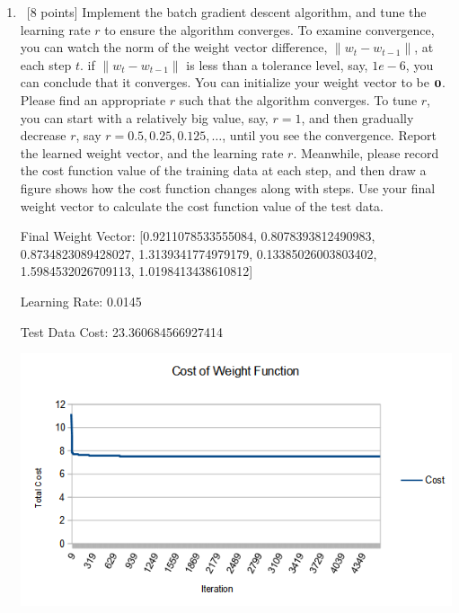 \documentclass[12pt, fullpage,letterpaper]{article}
\begin{document}
\begin{enumerate}
	\begin{enumerate}
		\item~[8 points] Implement the batch gradient descent algorithm, and tune the learning rate $r$ to ensure the algorithm converges.  To examine convergence, you can watch the norm of the weight vector difference,  $\|w_{t} - w_{t-1}\|$,  at each step $t$.  if $\|w_{t} - w_{t-1}\|$ is  less than a tolerance level, say, $1e-6$, you can conclude that it converges. You can initialize your weight vector to be ${\bf 0}$.  Please find an appropriate $r$ such that the algorithm converges. To tune $r$, you can start with a relatively big value, say, $r=1$, and then gradually decrease $r$, say $r=0.5, 0.25, 0.125, \ldots$, until you see the convergence. 
		Report the learned weight vector, and the learning rate $r$. Meanwhile, please record the cost function  value of the training data at each step, and then draw a figure shows how the cost function changes along with steps. Use your final weight vector to calculate  the cost function value of the test data. 
		
		\bigskip
		
		Final Weight Vector: [0.9211078533555084, 0.8078393812490983, 0.8734823089428027, 1.3139341774979179, 0.13385026003803402, 1.5984532026709113, 1.0198413438610812]
		
		Learning Rate: 0.0145
		
		Test Data Cost: 23.360684566927414
		
		\begin{center}
			\includegraphics[scale=0.8]{batch_graph}
		\end{center}
		

\end{enumerate}
\end{enumerate}
\end{document}

